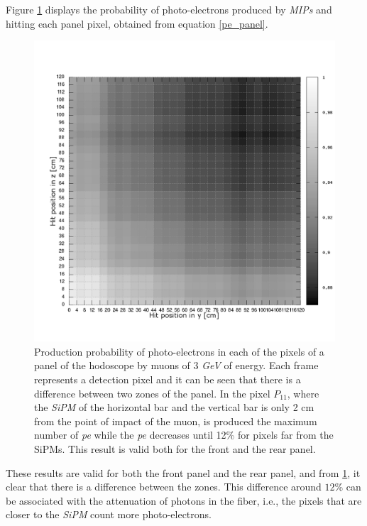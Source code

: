 \documentclass[submitting]{nst}
\begin{document}
Figure \ref{atenuacion_panel_bw} displays the probability of photo-electrons produced by \textsl{MIPs} and hitting each panel pixel, obtained from equation \ref{pe_panel}.
\begin{figure}[h!]
    \centering
        \includegraphics[scale=0.3]{Figures/atenuacion_panel_bw.png}
   \caption[Response of the hodoscope panels]{Production probability of photo-electrons in each of the pixels of a panel of the hodoscope by muons of 3   \textsl{GeV}  of energy. Each frame represents a detection pixel and it can be seen that there is a difference between two zones of the panel. In the pixel $P_{11}$, where the \textsl{SiPM} of the horizontal bar and the vertical bar is only 2 cm from the point of impact of the muon, is produced the maximum number of \textsl{pe} while the \textsl{pe} decreases until 12\% for pixels far from the SiPMs. This result is valid both for the front and the rear panel.}\label{atenuacion_panel_bw}
\end{figure}

These results are valid for both the front panel and the rear panel, and from \ref{atenuacion_panel_bw}, it clear that there is a difference between the zones. This difference around $12$\% can be associated with the attenuation of photons in the fiber, i.e., the pixels that are closer to the \textsl{SiPM} count more photo-electrons.  
\end{document}
